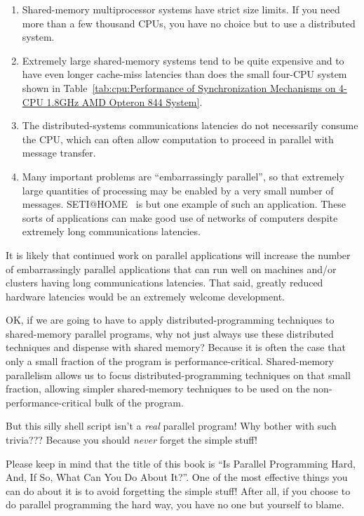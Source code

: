 	\begin{enumerate}
	\item	Shared-memory multiprocessor systems have strict size limits.
		If you need more than a few thousand CPUs, you have no
		choice but to use a distributed system.
	\item	Extremely large shared-memory systems tend to be
		quite expensive and to have even longer cache-miss
		latencies than does the small four-CPU system
		shown in
		Table~\ref{tab:cpu:Performance of Synchronization Mechanisms on 4-CPU 1.8GHz AMD Opteron 844 System}.
	\item	The distributed-systems communications latencies do
		not necessarily consume the CPU, which can often allow
		computation to proceed in parallel with message transfer.
	\item	Many important problems are ``embarrassingly parallel'',
		so that extremely large quantities of processing may
		be enabled by a very small number of messages.
		SETI@HOME~\cite{SETIatHOME2008}
		is but one example of such an application.
		These sorts of applications can make good use of networks
		of computers despite extremely long communications
		latencies.
	\end{enumerate}

	It is likely that continued work on parallel applications will
	increase the number of embarrassingly parallel applications that
	can run well on machines and/or clusters having long communications
	latencies.
	That said, greatly reduced hardware latencies would be an
	extremely welcome development.

\QuickQ{}
	OK, if we are going to have to apply distributed-programming
	techniques to shared-memory parallel programs, why not just
	always use these distributed techniques and dispense with
	shared memory?
\QuickA{}
	Because it is often the case that only a small fraction of
	the program is performance-critical.
	Shared-memory parallelism allows us to focus distributed-programming
	techniques on that small fraction, allowing simpler shared-memory
	techniques to be used on the non-performance-critical bulk of
	the program.

\QuickQ{}
	But this silly shell script isn't a \emph{real} parallel program!
	Why bother with such trivia???
\QuickA{}
	Because you should \emph{never} forget the simple stuff!

	Please keep in mind that the title of this book is
	``Is Parallel Programming Hard, And, If So, What Can You Do About It?''.
	One of the most effective things you can do about it is to
	avoid forgetting the simple stuff!
	After all, if you choose to do parallel programming the hard
	way, you have no one but yourself to blame.

